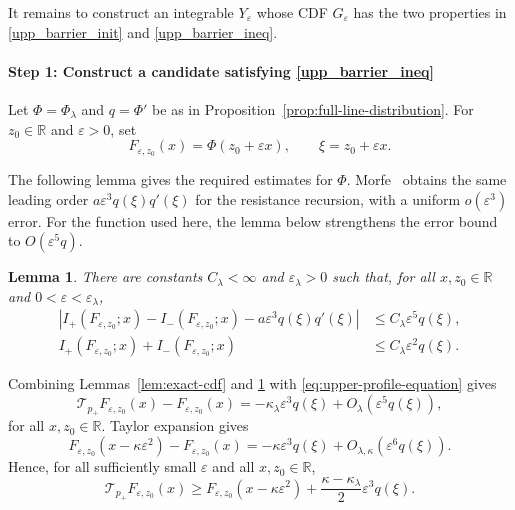 \documentclass[12pt,preprint]{amsart}
\numberwithin{equation}{section}
\theoremstyle{plain}
\newtheorem{lemma}[theorem]{Lemma}
\theoremstyle{definition}
\newcommand{\R}{\mathbb R}
\begin{document}
It remains to construct an integrable $Y_\varepsilon$ whose CDF
$G_\varepsilon$ has the two properties in \eqref{upp_barrier_init}
and \eqref{upp_barrier_ineq}.

\paragraph*{Step 1: Construct a candidate satisfying \eqref{upp_barrier_ineq}}
 Let
$\Phi=\Phi_{\lambda}$ and $q=\Phi'$ be as in
Proposition~\ref{prop:full-line-distribution}.  For $z_0\in\mathbb R$
and $\varepsilon>0$, set
\[
 F_{\varepsilon,z_0}(x)=\Phi(z_0+\varepsilon x),
 \qquad
 \xi=z_0+\varepsilon x.
\]

The following lemma gives the
required estimates for $\Phi$. Morfe~\cite[Proposition~10]{Morfe2026} obtains the same leading order $a\varepsilon^3q(\xi)q'(\xi)$ for the resistance recursion, with a  uniform $o(\varepsilon^3)$ error.  For the function used here, the lemma below strengthens the error bound to $O(\varepsilon^5q)$.
\begin{lemma}
\label{lem:weighted-consistency}
There are constants $C_\lambda<\infty$ and $\varepsilon_\lambda>0$
such that, for all $x,z_0\in\mathbb R$ and
$0<\varepsilon<\varepsilon_\lambda$,
\begin{align}
 \left|I_+(F_{\varepsilon,z_0};x)-I_-(F_{\varepsilon,z_0};x)
       -a\varepsilon^3q(\xi)q'(\xi)\right|
 &\le C_\lambda\varepsilon^5q(\xi),
 \label{eq:weighted-difference}\\
 I_+(F_{\varepsilon,z_0};x)+I_-(F_{\varepsilon,z_0};x)
 &\le C_\lambda\varepsilon^2q(\xi).
 \label{eq:weighted-sum}
\end{align}
\end{lemma}

Combining Lemmas~\ref{lem:exact-cdf} and
\ref{lem:weighted-consistency} with
\eqref{eq:upper-profile-equation} gives
\begin{equation*}
 \mathcal T_{p_+}F_{\varepsilon,z_0}(x)
 -F_{\varepsilon,z_0}(x)
 =-\kappa_{\lambda}\varepsilon^3q(\xi)
  +O_{\lambda}(\varepsilon^5q(\xi)),
\end{equation*}
for all $x,z_0\in\R$.  Taylor expansion gives
\begin{equation*}
 F_{\varepsilon,z_0}(x-\kappa\varepsilon^2)
 -F_{\varepsilon,z_0}(x)
 =-\kappa\varepsilon^3q(\xi)
  +O_{\lambda,\kappa}(\varepsilon^6q(\xi)).
\end{equation*}
Hence, for all sufficiently small $\varepsilon$ and all
$x,z_0\in\mathbb R$,
\begin{equation}
 \mathcal T_{p_+}F_{\varepsilon,z_0}(x)
 \ge F_{\varepsilon,z_0}(x-\kappa\varepsilon^2)
 +\frac{\kappa-\kappa_{\lambda}}{2}\varepsilon^3q(\xi).
 \label{eq:strict-untruncated-upper}
\end{equation}
\end{document}
